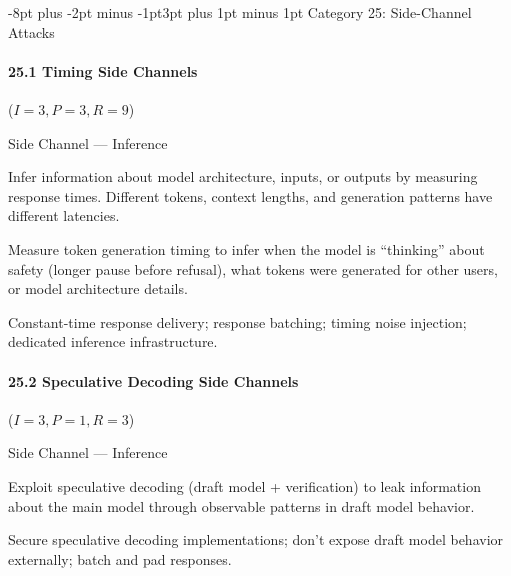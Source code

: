 \documentclass[conference]{IEEEtran}
\makeatletter
\renewcommand{\subsection}{\@startsection{subsection}{2}{\z@}%
  {-8pt plus -2pt minus -1pt}{3pt plus 1pt minus 1pt}%
  {\normalfont\normalsize\bfseries\sffamily\color{accentblue}}}
\newenvironment{attackentry}{\begin{description}[style=unboxed,leftmargin=0cm,itemsep=1pt,parsep=1pt,topsep=2pt,font=\sffamily\small\color{accentdark}]}{\end{description}}
\makeatother
\begin{document}
\subsection{Category 25: Side-Channel Attacks}

\paragraph{25.1 Timing Side Channels} ($I{=}3, P{=}3, R{=}9$)
\begin{attackentry}
\item[Category:] Side Channel --- Inference
\item[How it works:] Infer information about model architecture, inputs, or outputs by measuring response times. Different tokens, context lengths, and generation patterns have different latencies.
\item[Example:] Measure token generation timing to infer when the model is ``thinking'' about safety (longer pause before refusal), what tokens were generated for other users, or model architecture details.
\item[Mitigations:] Constant-time response delivery; response batching; timing noise injection; dedicated inference infrastructure.
\end{attackentry}

\paragraph{25.2 Speculative Decoding Side Channels} ($I{=}3, P{=}1, R{=}3$)
\begin{attackentry}
\item[Category:] Side Channel --- Inference
\item[How it works:] Exploit speculative decoding (draft model + verification) to leak information about the main model through observable patterns in draft model behavior.
\item[Mitigations:] Secure speculative decoding implementations; don't expose draft model behavior externally; batch and pad responses.
\end{attackentry}
\end{document}

